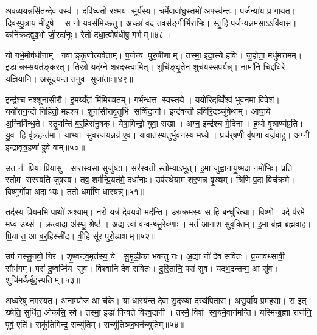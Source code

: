 अ॒व॒व्यय॒न्नसि॑तन्देव॒ वस्व॑। दवि॑ध्वतो र॒श्मय॒ सूर्य॑स्य। चर्मे॒वावा॑धु॒स्तमो॑ अ॒फ्स्व॑न्तः। प॒र्जन्या॑य॒ प्र गा॑यत। दि॒वस्पु॒त्राय॑ मी॒ढुषे। स नो॑ य॒वस॑मिच्छतु। अच्छा॑ वद त॒वस॑ङ्गी॒र्भिरा॒भिः। स्तु॒हि प॒र्जन्य॒न्नम॒साऽऽवि॑वास। कनि॑क्रदद्वृष॒भो जी॒रदा॑नुः। रेतो॑ दधा॒त्वोष॑धीषु॒ गर्भम्॥४८॥

यो गर्भ॒मोष॑धीनाम्। गवाङ्कृ॒णोत्यर्व॑ताम्। प॒र्जन्य॑ पुरु॒षीणाम्। तस्मा॒ इदा॒स्ये॑ ह॒विः। जू॒होता॒ मधु॑मत्तमम्। इडान्नस्सं॒यत॑ङ्करत्। ति॒स्रो यद॑ग्ने श॒रद॒स्त्वामित्। शुचि॑ङ्घृ॒तेन॒ शुच॑यस्सप॒र्यन्न्। नामा॑नि चिद्दधिरे य॒ज्ञिया॑नि। असू॑दयन्त त॒नुव॒ सुजा॑ताः॥४९॥

इन्द्र॑श्च नश्शुनासीरौ। इ॒मय्यँ॒ज्ञं मि॑मिख्षतम्। गर्भ॑न्धत्त स्व॒स्तये। ययो॑रि॒दव्विँश्वं॒ भुव॑नमा वि॒वेश॑। ययो॑रान॒न्दो निहि॑तो॒ मह॑श्च। शुना॑सीरावृ॒तुभि॑ सव्विँदा॒नौ। इन्द्र॑वन्तौ ह॒विरि॒दञ्जु॑षेथाम्। आघा॒ये अ॒ग्निमि॑न्ध॒ते। स्तृ॒णन्ति॑ ब॒र्॒हिरा॑नु॒षक्। येषा॒मिन्द्रो॒ युवा॒ सखा। अग्न॒ इन्द्र॑श्च मे॒दिना। ह॒थो वृ॒त्राण्य॑प्र॒ति। यु॒व हि वृ॑त्र॒हन्त॑मा। याभ्या॒ सुव॒रज॑य॒न्नग्र॑ ए॒व। यावा॑तस्थ॒तुर्भुव॑नस्य॒ मध्ये। प्रच॑र्‌ष॒णी वृ॑षणा॒ वज्र॑बाहू। अ॒ग्नी इन्द्रा॑वृत्र॒हणा॑ हुवे वाम्॥५०॥\anuvakamend[मन॒ इन्द्रो॒ गवि॑ष्टिषु॒ तन्तु॒ङ्गर्भ॒ सुजा॑ता॒ सखा॑ स॒प्त च॑]

उ॒त न॑ प्रि॒या प्रि॒यासु॑। स॒प्तस्वसा॒ सुजु॑ष्टा। सर॑स्वती॒ स्तोम्या॑ऽभूत्। इ॒मा जुह्वा॑नायु॒ष्मदा नमो॑भिः। प्रति॒ स्तोम सरस्वति जुषस्व। तव॒ शर्म॑न्प्रि॒यत॑मे॒ दधा॑नाः। उप॑स्थेयाम शर॒णन्न वृ॒ख्षम्। त्रिणि॑ प॒दा विच॑क्रमे। विष्णु॑र्गो॒पा अदाभ्यः। ततो॒ धर्मा॑णि धा॒रयन्न्॑॥५१॥

तद॑स्य प्रि॒यम॒भि पाथो॑ अश्याम्। नरो॒ यत्र॑ देव॒यवो॒ मद॑न्ति। उ॒रु॒क्र॒मस्य॒ स हि बन्धु॑रि॒त्था। विष्णो प॒दे प॑र॒मे मध्व॒ उथ्स॑। क्र॒त्वा॒दा अ॑स्थु॒ श्रेष्ठ॑। अ॒द्य त्वा॑ व॒न्वन्थ्सु॒रेक्णाः। मर्त॑ आनाश सुवृ॒क्तिम्। इ॒मा ब्र॑ह्म ब्रह्मवाह। प्रि॒या त॒ आ ब॒र्॒हिस्सी॑द। वी॒हि सू॑र पुरो॒डाशम्॥५२॥

उप॑ नस्सू॒नवो॒ गिर॑। शृ॒ण्वन्त्व॒मृत॑स्य॒ ये। सु॒मृ॒डी॒का भ॑वन्तु नः। अ॒द्या नो॑ देव सवितः। प्र॒जाव॑थ्सावी॒ सौभ॑गम्। परा॑ दु॒ष्वप्नि॑य सुव। विश्वा॑नि देव सवितः। दु॒रि॒तानि॒ परा॑ सुव। यद्भ॒द्रन्तन्म॒ आ सु॑व। शुचि॑म॒र्कैर्बृह॒स्पतिम्॥५३॥

अ॒ध्व॒रेषु॑ नमस्यत। अ॒ना॒म्योज॒ आ च॑के। या धा॒रय॑न्त दे॒वा सु॒दख्षा॒ दख्ष॑पितारा। अ॒सु॒र्या॑य॒ प्रम॑हसा। स इत् ख्षेति॒ सुधि॑त॒ ओक॑सि॒ स्वे। तस्मा॒ इडा॑ पिन्वते विश्व॒दानी। तस्मै॒ विश॑ स्व॒यमे॒वान॑मन्ति। यस्मि॑न्ब्र॒ह्मा राज॑नि॒ पूर्व॒ एति॑। सकू॑तिमिन्द्र॒ सच्यु॑तिम्। सच्यु॑तिञ्ज॒घन॑च्युतिम्॥५४॥

